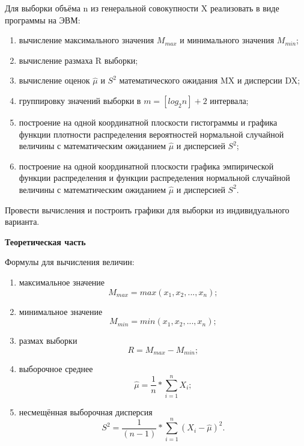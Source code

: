 \documentclass[12pt,a4paper]{scrartcl}
\begin{document}
Для выборки объёма n из генеральной совокупности X реализовать в виде программы на ЭВМ:
\begin{enumerate}
	\item вычисление максимального значения $M_{max}$ и минимального значения $M_{min}$;
	\item вычисление размаха R выборки;
	\item вычисление оценок $\hat{μ}$ и $S^2$ математического ожидания MX и дисперсии DX;
	\item группировку значений выборки в $m = [log_2 n] + 2$ интервала;
	\item построение на одной координатной плоскости гистограммы и графика функции плотности распределения вероятностей нормальной случайной величины с математическим ожиданием $\hat{μ}$ и дисперсией $S^2$;
	\item построение на одной координатной плоскости графика эмпирической функции распределения и функции распределения нормальной случайной величины с математическим ожиданием $\hat{μ}$ и дисперсией $S^2$.
\end{enumerate}

Провести вычисления и построить графики для выборки из индивидуального варианта.

\newpage
{}
\begin{center}
\textbf {Теоретическая часть}
\end{center}

Формулы для вычисления величин:
\begin{enumerate}
	\item максимальное значение \begin{equation}\label{eq1.1} M_{max} = max(x_1, x_2, ... , x_n) ;\end{equation}
	\item минимальное значение \begin{equation}\label{eq1.2}  M_{min} = min(x_1, x_2, ... , x_n) ;\end{equation} 
	\item размах выборки \begin{equation}\label{eq1.3} R = M_{max} - M_{min} ;\end{equation} 
	\item выборочное среднее \begin{equation}\label{eq1.4} \hat{μ} = \frac {1} {n} * \sum  \limits_{i=1}^n X_i ;\end{equation}
	\item несмещённая выборочная дисперсия \begin{equation}\label{eq1.5} S^2 = \frac {1} {(n - 1)} * \sum  \limits_{i=1}^n (X_i - \hat{μ})^2 . \end{equation} 
\end{enumerate}
\end{document}
